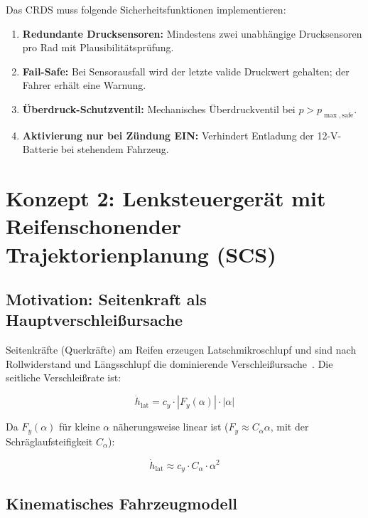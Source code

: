 ﻿\documentclass[12pt,a4paper]{article}
\theoremstyle{definition}
\theoremstyle{remark}
\begin{document}
Das CRDS muss folgende Sicherheitsfunktionen implementieren:

\begin{enumerate}
  \item \textbf{Redundante Drucksensoren:} Mindestens zwei unabhängige Drucksensoren
        pro Rad mit Plausibilitätsprüfung.
  \item \textbf{Fail-Safe:} Bei Sensorausfall wird der letzte valide Druckwert
        gehalten; der Fahrer erhält eine Warnung.
  \item \textbf{Überdruck-Schutzventil:} Mechanisches Überdruckventil bei
        $p > p_{\max,\mathrm{safe}}$.
  \item \textbf{Aktivierung nur bei Zündung EIN:} Verhindert Entladung der
        12-V-Batterie bei stehendem Fahrzeug.
\end{enumerate}

\section{Konzept 2: Lenksteuergerät mit Reifenschonender Trajektorienplanung (SCS)}
\label{sec:scs}

\subsection{Motivation: Seitenkraft als Hauptverschleißursache}

Seitenkräfte (Querkräfte) am Reifen erzeugen Latschmikroschlupf und sind
nach Rollwiderstand und Längsschlupf die dominierende Verschleißursache~\cite{Niskanen2014}.
Die seitliche Verschleißrate ist:

\begin{equation}
  \dot{h}_{\mathrm{lat}} = c_y \cdot |F_y(\alpha)| \cdot |\alpha|
  \label{eq:wear_lat}
\end{equation}

Da $F_y(\alpha)$ für kleine $\alpha$ näherungsweise linear ist ($F_y \approx C_\alpha \alpha$,
mit der Schräglaufsteifigkeit $C_\alpha$):

\begin{equation}
  \dot{h}_{\mathrm{lat}} \approx c_y \cdot C_\alpha \cdot \alpha^2
  \label{eq:wear_lat_lin}
\end{equation}

\subsection{Kinematisches Fahrzeugmodell}
\end{document}
